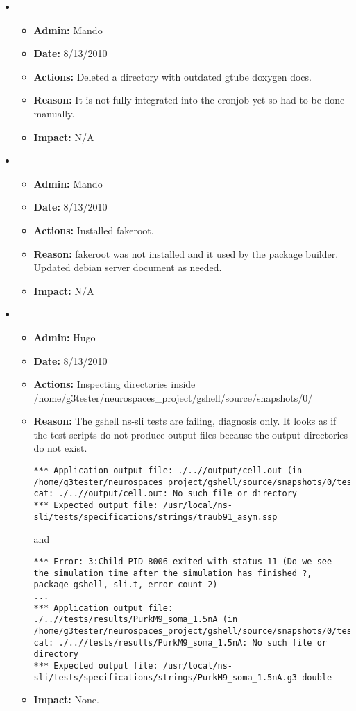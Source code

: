 \documentclass[12pt]{article}
\begin{document}
\begin{itemize}
\item 
\begin{itemize}
\item[] {\bf Admin:} Mando
\item[] {\bf Date:} 8/13/2010 
\item[] {\bf Actions:} Deleted a directory with outdated gtube doxygen docs.
\item[] {\bf Reason:} It is not fully integrated into the cronjob yet so had to be done manually.
\item[] {\bf Impact:} N/A
\end{itemize}

\item 
\begin{itemize}
\item[] {\bf Admin:} Mando
\item[] {\bf Date:} 8/13/2010 
\item[] {\bf Actions:} Installed fakeroot.
\item[] {\bf Reason:} fakeroot was not installed and it used by the package builder. Updated debian server document as needed.
\item[] {\bf Impact:} N/A
\end{itemize}

	
\item 
\begin{itemize}
\item[] {\bf Admin:} Hugo
\item[] {\bf Date:} 8/13/2010 
\item[] {\bf Actions:} Inspecting directories inside
  /home/g3tester/neurospaces\_project/gshell/source/snapshots/0/
\item[] {\bf Reason:} The gshell ns-sli tests are failing, diagnosis
  only.  It looks as if the test scripts do not produce output files
  because the output directories do not exist.
\begin{verbatim}
*** Application output file: ./..//output/cell.out (in /home/g3tester/neurospaces_project/gshell/source/snapshots/0/tests)
cat: ./..//output/cell.out: No such file or directory
*** Expected output file: /usr/local/ns-sli/tests/specifications/strings/traub91_asym.ssp
\end{verbatim}
and
\begin{verbatim}
*** Error: 3:Child PID 8006 exited with status 11 (Do we see the simulation time after the simulation has finished ?, package gshell, sli.t, error_count 2)
...
*** Application output file: ./..//tests/results/PurkM9_soma_1.5nA (in /home/g3tester/neurospaces_project/gshell/source/snapshots/0/tests)
cat: ./..//tests/results/PurkM9_soma_1.5nA: No such file or directory
*** Expected output file: /usr/local/ns-sli/tests/specifications/strings/PurkM9_soma_1.5nA.g3-double
\end{verbatim}
\item[] {\bf Impact:} None.
\end{itemize}


\end{itemize}
\end{document}
